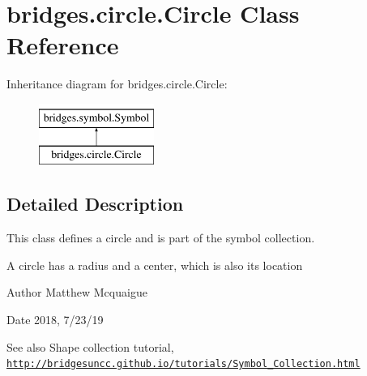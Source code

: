 \hypertarget{classbridges_1_1circle_1_1_circle}{}\section{bridges.\+circle.\+Circle Class Reference}
\label{classbridges_1_1circle_1_1_circle}
Inheritance diagram for bridges.\+circle.\+Circle\+:\begin{figure}[H]
\begin{center}
\leavevmode
\includegraphics[height=2.000000cm]{classbridges_1_1circle_1_1_circle}
\end{center}
\end{figure}


\subsection{Detailed Description}
This class defines a circle and is part of the symbol collection. 

A circle has a radius and a center, which is also its location

\begin{DoxyAuthor}{Author}
Matthew Mcquaigue 
\end{DoxyAuthor}
\begin{DoxyDate}{Date}
2018, 7/23/19
\end{DoxyDate}
\begin{DoxySeeAlso}{See also}
Shape collection tutorial, \href{http://bridgesuncc.github.io/tutorials/Symbol_Collection.html}{\tt http\+://bridgesuncc.\+github.\+io/tutorials/\+Symbol\+\_\+\+Collection.\+html} 
\end{DoxySeeAlso}
